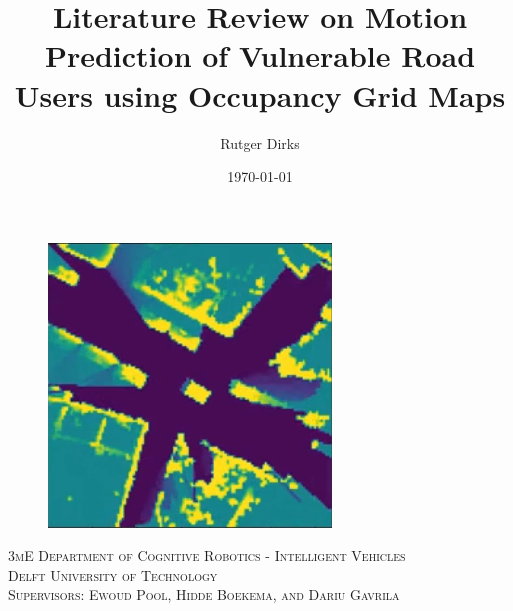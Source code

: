 \documentclass[a4paper]{article}
\title{Literature Review on Motion Prediction of Vulnerable Road Users using Occupancy Grid Maps}
\author{Rutger Dirks}
\date{\today{}}
\begin{document}
	\selectfont %
	
	\begin{titlepage}

		\maketitle{}
		
		\begin{figure}[h]
			\centering
			\includegraphics[width=0.6\linewidth]{Figures/Title_Page_OGM}
			\label{fig:title_page}
		\end{figure}
		
		\begin{center}
			\textsc{3mE Department of Cognitive Robotics - Intelligent Vehicles}\\[1cm]
			\textsc{\LARGE Delft University of Technology}\\[1cm]
			\textsc{Supervisors: Ewoud Pool, Hidde Boekema, and Dariu Gavrila}\\[5cm]
		\end{center}


		

	\end{titlepage}
	 \selectfont	
	\newpage
	\printnoidxglossary[type=acronym]
	\printacronyms
	\newpage
	\tableofcontents{}	
	\newpage	
	
	\newpage
	
	\newpage
	
	\newpage
	
	\newpage
	
	\newpage
	
	\newpage
	\appendix
	
	\newpage
	
	
	
	\newpage
	
	
	
	
	
\end{document}
